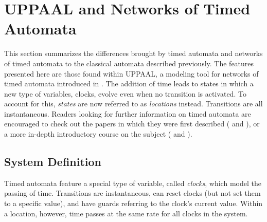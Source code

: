\section{UPPAAL and Networks of Timed Automata}
This section summarizes the differences brought by timed automata and networks
of timed automata to the classical automata described previously. The features
presented here are those found within UPPAAL, a modeling tool for networks of
timed automata introduced in \cite{Bengtsson:1996:UTS:239587.239611}. The
addition of time leads to states in which a new type of variables, clocks,
evolve even when no transition is activated. To account for this,
\textit{states} are now referred to as \textit{locations} instead. Transitions
are all instantaneous. Readers looking for further information on timed
automata are encouraged to check out the papers in which they were first
described (\cite{143902} and \cite{tcs126(2)-AD}), or a more in-depth
introductory course on the subject (\cite{bouyer-cours} and
\cite{cours-raskin}).

\subsection{System Definition}
\begin{definition}[Clocks]
Timed automata feature a special type of variable, called \textit{clocks},
which model the passing of time. Transitions are instantaneous, can reset
clocks (but not set them to a specific value), and have guards referring to the
clock's current value. Within a location, however, time passes at the same rate
for all clocks in the system.
\end{definition}

